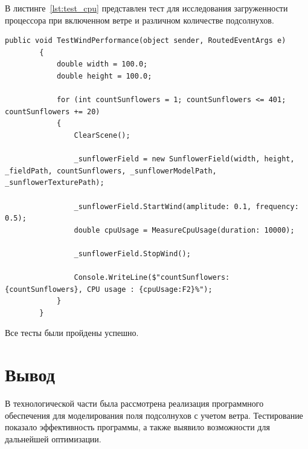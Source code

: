 В листинге~\ref{lst:test_cpu} представлен тест для исследования загруженности процессора при включенном ветре и различном количестве подсолнухов.
\begin{center}
\begin{lstlisting}[caption={Тест для исследования загруженности процессора при включенном ветре и различном количестве подсолнухов.}, label={lst:test_cpu}]
public void TestWindPerformance(object sender, RoutedEventArgs e)
        {
            double width = 100.0;
            double height = 100.0;
            
            for (int countSunflowers = 1; countSunflowers <= 401; countSunflowers += 20)
            {
                ClearScene();

                _sunflowerField = new SunflowerField(width, height, _fieldPath, countSunflowers, _sunflowerModelPath, _sunflowerTexturePath);

                _sunflowerField.StartWind(amplitude: 0.1, frequency: 0.5);
                double cpuUsage = MeasureCpuUsage(duration: 10000); 

                _sunflowerField.StopWind();

                Console.WriteLine($"countSunflowers: {countSunflowers}, CPU usage : {cpuUsage:F2}%");
            }
        }
\end{lstlisting}
\end{center}

Все тесты были пройдены успешно.

\section*{Вывод}

В технологической части была рассмотрена реализация программного обеспечения для моделирования поля подсолнухов с учетом ветра. Тестирование показало эффективность программы, а также выявило возможности для дальнейшей оптимизации. 